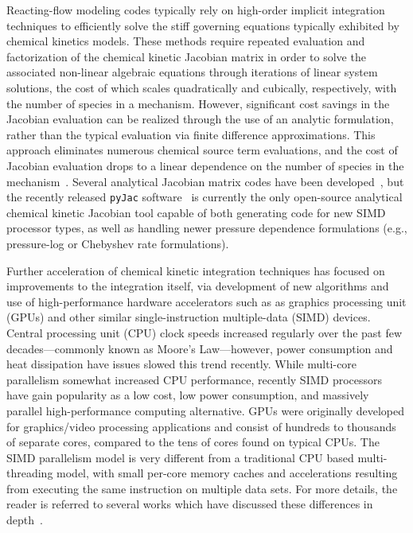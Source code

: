 \documentclass[preprint]{elsarticle}
\begin{document}
Reacting-flow modeling codes typically rely on high-order implicit integration techniques to efficiently solve the stiff governing equations typically exhibited by chemical kinetics models.
These methods require repeated evaluation and factorization of the chemical kinetic Jacobian matrix in order to solve the associated non-linear algebraic equations through iterations of linear system solutions, the cost of which scales quadratically and cubically, respectively, with the number of species in a mechanism.
However, significant cost savings in the Jacobian evaluation can be realized through the use of an analytic formulation, rather than the typical evaluation via finite difference approximations.
This approach eliminates numerous chemical source term evaluations, and the cost of Jacobian evaluation drops to a linear dependence on the number of species in the mechanism~\cite{Lu:2009gh}.
Several analytical Jacobian matrix codes have been developed~\cite{Safta:2011vn,Youssefi:2011tm,Bisetti:2012jw,Perini:2012gy,Dijkmans:2014bb}, but the recently released \texttt{pyJac} software~\cite{Niemeyer:2015im,Niemeyer:2015ws} is currently the only open-source analytical chemical kinetic Jacobian tool capable of both generating code for new SIMD processor types, as well as handling newer pressure dependence formulations (e.g., pressure-log or Chebyshev rate formulations).

Further acceleration of chemical kinetic integration techniques has focused on improvements to the integration itself, via development of new algorithms and use of high-performance hardware accelerators such as as graphics processing unit (GPUs) and other similar single-instruction multiple-data (SIMD) devices.
Central processing unit (CPU) clock speeds increased regularly over the past few decades---commonly known as Moore's Law---however, power consumption and heat dissipation have issues slowed this trend recently.
While multi-core parallelism somewhat increased CPU performance, recently SIMD processors have gain popularity as a low cost, low power consumption, and massively parallel high-performance computing alternative.
GPUs were originally developed for graphics\slash video processing applications and consist of hundreds to thousands of separate cores, compared to the tens of cores found on typical CPUs.
The SIMD parallelism model is very different from a traditional CPU based multi-threading model, with small per-core memory caches and accelerations resulting from executing the same instruction on multiple data sets.
For more details, the reader is referred to several works which have discussed these differences in depth~\cite{Cruz:2011gc,Brodtkorb:2013hn,Niemeyer:2014hn}.
\end{document}
